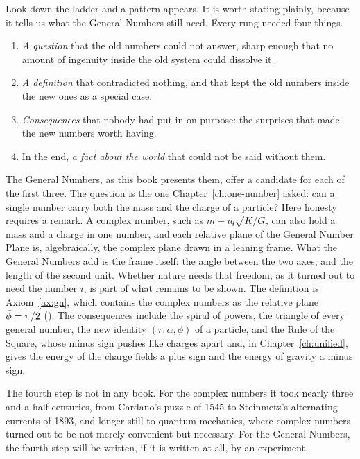 Look down the ladder and a pattern appears. It is worth stating plainly, because it tells us what the General Numbers still need. Every rung needed four things.
\begin{enumerate}
  \item \emph{A question} that the old numbers could not answer, sharp enough that no amount of ingenuity inside the old system could dissolve it.
  \item \emph{A definition} that contradicted nothing, and that kept the old numbers inside the new ones as a special case.
  \item \emph{Consequences} that nobody had put in on purpose: the surprises that made the new numbers worth having.
  \item In the end, \emph{a fact about the world} that could not be said without them.
\end{enumerate}

The General Numbers, as this book presents them, offer a candidate for each of the first three. The question is the one Chapter~\ref{ch:one-number} asked: can a single number carry both the mass and the charge of a particle? Here honesty requires a remark. A complex number, such as $m + iq\sqrt{K/G}$, can also hold a mass and a charge in one number, and each relative plane of the General Number Plane is, algebraically, the complex plane drawn in a leaning frame. What the General Numbers add is the frame itself: the angle between the two axes, and the length of the second unit. Whether nature needs that freedom, as it turned out to need the number $i$, is part of what remains to be shown. The definition is Axiom~\ref{ax:gn}, which contains the complex numbers as the relative plane $\bar{\phi} = \pi/2$ (). The consequences include the spiral of powers, the triangle of every general number, the new identity $(r, \alpha, \phi)$ of a particle, and the Rule of the Square, whose minus sign pushes like charges apart and, in Chapter~\ref{ch:unified}, gives the energy of the charge fields a plus sign and the energy of gravity a minus sign.

The fourth step is not in any book. For the complex numbers it took nearly three and a half centuries, from Cardano's puzzle of 1545 to Steinmetz's alternating currents of 1893, and longer still to quantum mechanics, where complex numbers turned out to be not merely convenient but necessary. For the General Numbers, the fourth step will be written, if it is written at all, by an experiment.

